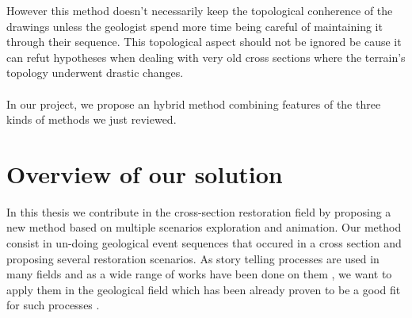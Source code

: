 \documentclass[12pt, a4paper]{report} %
\begin{document}
However this method doesn't necessarily keep the topological conherence of the drawings unless the geologist spend more time being careful of maintaining it through their sequence. This topological aspect should not be ignored be cause it can refut hypotheses when dealing with very old cross sections where the terrain's topology underwent drastic changes.\\\\
In our project, we propose an hybrid method combining features of the three kinds of methods we just reviewed.
\chapter{Overview of our solution}
\label{overview}
In this thesis we contribute in the cross-section restoration field by proposing a new method based on multiple scenarios exploration and animation. Our method consist in un-doing geological event sequences that occured in a cross section and proposing several restoration scenarios. As story telling processes are used in many fields and as a wide range of works have been done on them \cite{young}, we want to apply them in the geological field which has been already proven to be a good fit for such processes \cite{lidal}.\\\\
\end{document}
